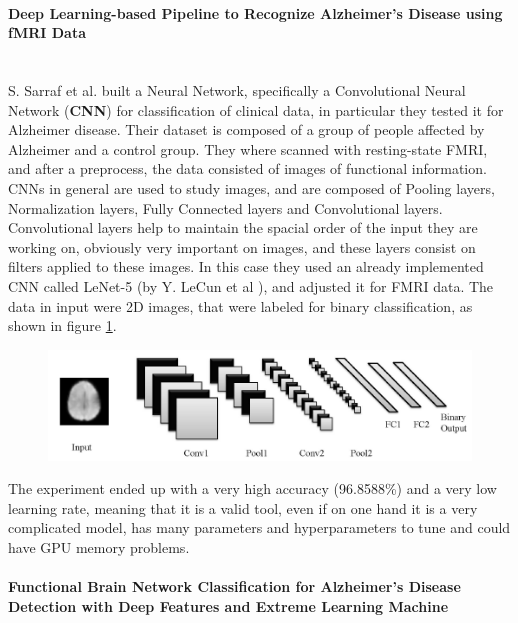 \paragraph{Deep Learning-based Pipeline to Recognize Alzheimer’s Disease using fMRI Data}\
\\

S. Sarraf et al. \cite{Sarraf066910} built a Neural Network, specifically a Convolutional Neural Network (\textbf{CNN}) for classification of clinical data, in particular they tested it for Alzheimer disease. Their dataset is composed of a group of people affected by Alzheimer and a control group. They where scanned with resting-state FMRI, and after a preprocess, the data consisted of images of functional information. 
\\

CNNs in general are used to study images, and are composed of Pooling layers, Normalization layers, Fully Connected layers and Convolutional layers. Convolutional layers help to maintain the spacial order of the input they are working on, obviously very important on images, and these layers consist on filters applied to these images. In this case they used an already implemented CNN called LeNet-5 (by Y. LeCun et al \cite{726791}), and adjusted it for FMRI data. The data in input were 2D images, that were labeled for binary classification, as shown in figure \ref{fig:diagram7}.

\begin{figure}[htbp]
	\centering
	\includegraphics[scale=1]{Immagini/deep-learning1.PNG}
	\caption{\label{fig:diagram7}}
\end{figure}

The experiment ended up with a very high accuracy (96.8588\%) and a very low learning rate, meaning that it is a valid tool, even if on one hand it is a very complicated model, has many parameters and hyperparameters to tune and could have GPU memory problems.

\paragraph{Functional Brain Network Classification for Alzheimer’s Disease Detection with Deep Features and Extreme Learning Machine}\
\\

